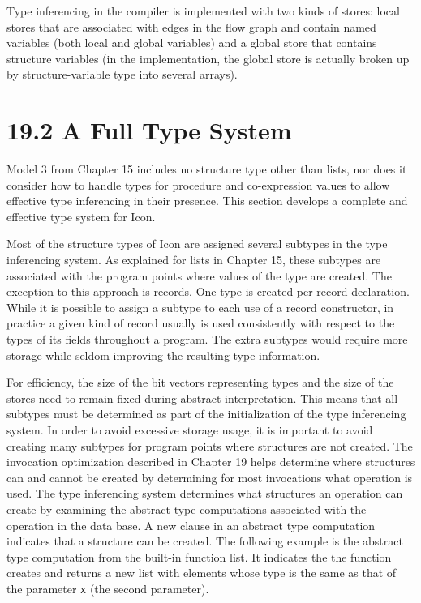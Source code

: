 Type inferencing in the compiler is implemented with two kinds of
stores: local stores that are associated with edges in the flow graph
and contain named variables (both local and global variables) and a
global store that contains structure variables (in the implementation,
the global store is actually broken up by structure-variable type into
several arrays).


\section[19.2 A Full Type System]{19.2 A Full Type System}

Model 3 from Chapter 15 includes no structure type other than lists,
nor does it consider how to handle types for procedure and
co-expression values to allow effective type inferencing in their
presence. This section develops a complete and effective type system
for Icon.

Most of the structure types of Icon are assigned several subtypes in
the type inferencing system. As explained for lists in Chapter 15,
these subtypes are associated with the program points where values of
the type are created. The exception to this approach is records. One
type is created per record declaration. While it is possible to assign
a subtype to each use of a record constructor, in practice a given
kind of record usually is used consistently with respect to the types
of its fields throughout a program. The extra subtypes would require
more storage while seldom improving the resulting type information.

For efficiency, the size of the bit vectors representing types and the
size of the stores need to remain fixed during abstract
interpretation. This means that all subtypes must be determined as
part of the initialization of the type inferencing system. In order to
avoid excessive storage usage, it is important to avoid creating many
subtypes for program points where structures are not created. The
invocation optimization described in Chapter 19 helps determine where
structures can and cannot be created by determining for most
invocations what operation is used. The type inferencing system
determines what structures an operation can create by examining the
abstract type computations associated with the operation in the data
base. A new clause in an abstract type computation indicates that a
structure can be created. The following example is the abstract type
computation from the built-in function list. It indicates the the
function creates and returns a new list with elements whose type is
the same as that of the parameter \texttt{x} (the second parameter).

